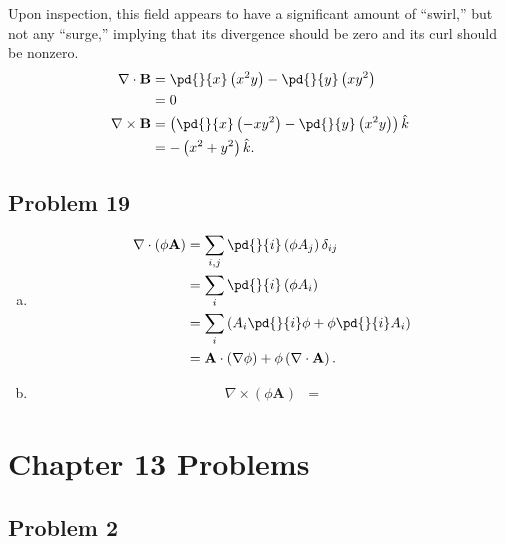 \documentclass[10pt]{mypackage}
\begin{document}
\begin{enumerate}[(a)]
\begin{center}
    \end{center}
    Upon inspection, this field appears to have a significant amount of ``swirl,'' but not any ``surge,'' implying that its divergence should be zero and its curl should be nonzero.
    \begin{align*}
      \nabla \cdot \mathbf{B} &= \pd{}{x}\left(x^2 y\right) - \pd{}{y}\left(xy^2\right)\\
                              &= 0\\
      \nabla \times \mathbf{B} &= \left(\pd{}{x}\left(-xy^2\right) - \pd{}{y}\left(x^2y\right)\right)\hat{k}\\
                               &= -\left(x^2 + y^2\right)\hat{k}.
    \end{align*}
\end{enumerate}
\subsection{Problem 19}%
\begin{enumerate}[(a)]
  \item 
    \begin{align*}
      \nabla \cdot \left(\phi \mathbf{A}\right) &= \sum_{i,j}\pd{}{i}\left(\phi A_{j}\right)\delta_{ij}\\
                                                &= \sum_{i}\pd{}{i}\left(\phi A_i\right)\\
                                                &= \sum_{i}\left(A_i\pd{}{i}\phi + \phi \pd{}{i}A_i\right)\\
                                                &= \mathbf{A}\cdot \left(\nabla \phi\right) + \phi \left(\nabla \cdot \mathbf{A}\right).
    \end{align*}
  \item 
    \begin{align*}
      \nabla \times \left(\phi \mathbf{A}\right) &= 
    \end{align*}
\end{enumerate}
\section{Chapter 13 Problems}%
\subsection{Problem 2}%
\end{document}

